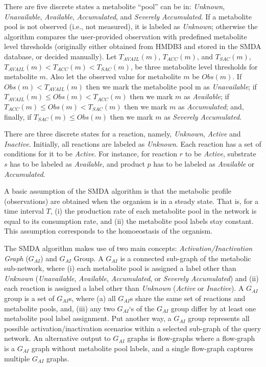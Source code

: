 There are five discrete states a metabolite “pool” can be in: \emph{Unknown},
\emph{Unavailable}, \emph{Available}, \emph{Accumulated}, and \emph{Severely
Accumulated}. If a metabolite pool is not observed (i.e., not measured), it is
labeled as \emph{Unknown}; otherwise the algorithm compares the user-provided
observation with predefined metabolite level thresholds (originally either
obtained from HMDB3 and stored in the SMDA database, or decided manually). Let
$T_{AVAIL} (m)$, $T_{ACC} (m)$, and $T_{SAC} (m)$, $T_{AVAIL} (m) < T_{ACC} (m)
< T_{SAC} (m)$, be three metabolite level thresholds for metabolite $m$. Also
let the observed value for metabolite $m$ be $Obs(m)$. If $Obs(m) < T_{AVAIL}
(m)$ then we mark the metabolite pool m as \emph{Unavailable}; if $T_{AVAIL} (m)
\leq Obs(m) < T_{ACC}(m)$ then we mark $m$ as \emph{Available}; if $T_{ACC} (m)
\leq Obs(m) < T_{SAC} (m)$ then we mark $m$ as \emph{Accumulated}; and, finally,
if $T_{SAC}(m) \leq Obs(m)$ then we mark $m$ as \emph{Severely Accumulated}.

There are three discrete states for a reaction, namely, \emph{Unknown},
\emph{Active} and \emph{Inactive}. Initially, all reactions are labeled as
\emph{Unknown}.  Each reaction has a set of conditions for it to be
\emph{Active}. For instance, for reaction $r$ to be \emph{Active}, substrate $s$
has to be labeled as \emph{Available}, and product $p$ has to be labeled as
\emph{Available} or \emph{Accumulated}.

A basic assumption of the SMDA algorithm is that the metabolic profile
(observations) are obtained when the organism is in a steady state. That is, for
a time interval $T$, (i) the production rate of each metabolite pool in the
network is equal to its consumption rate, and (ii) the metabolite pool labels
stay constant. This assumption corresponds to the homoeostasis of the organism.

The SMDA algorithm makes use of two main concepts: \emph{Activation/Inactivation
Graph} ($G_{AI}$) and $G_{AI}$ Group. A $G_{AI}$ is a connected sub-graph of the
metabolic sub-network, where (i) each metabolite pool is assigned a label other
than \emph{Unknown} (\emph{Unavailable}, \emph{Available}, \emph{Accumulated},
or \emph{Severely Accumulated}) and (ii) each reaction is assigned a label other
than \emph{Unknown} (\emph{Active} or \emph{Inactive}). A $G_{AI}$ group is a set
of $G_{AI}$s, where (a) all $G_{AI}$s share the same set of reactions and metabolite
pools, and, (iii) any two $G_{AI}$‘s of the $G_{AI}$ group differ by at least one
metabolite pool label assignment.  Put another way, a $G_{AI}$ group represents all
possible activation/inactivation scenarios within a selected sub-graph of the
query network. An alternative output to $G_{AI}$ graphs is flow-graphs where a
flow-graph is a $G_{AI}$ graph without metabolite pool labels, and a single
flow-graph captures multiple $G_{AI}$ graphs.
